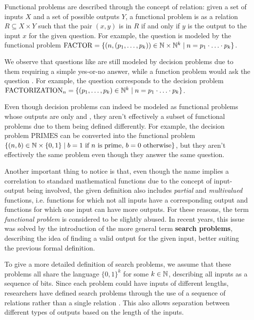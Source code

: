 \newpage

Functional problems are described through the concept of relation: given a set of inputs $X$ and a set of possible outputs $Y$, a functional problem is as a relation $R \subseteq X \times Y$ such that the pair $(x,y)$ is in $R$ if and only if $y$ is the output to the input $x$ for the given question. For example, the question  is modeled by the functional problem $\mathrm{FACTOR} = \{(n, (p_1, \ldots, p_k)) \in \mathbb{N} \times \mathbb{N}^k \mid n = p_1 \cdot \ldots \cdot p_k\}$.

We observe that questions like  are still modeled by decision problems due to them requiring a simple yes-or-no answer, while a function problem would ask the question . For example, the question  corresponds to the decision problem $\mathrm{FACTORIZATION}_n = \{(p_1, \ldots, p_k) \in \mathbb{N}^k \mid n = p_1 \cdot \ldots \cdot p_k\}$.

Even though decision problems can indeed be modeled as functional problems whose outputs are only  and , they aren't effectively a subset of functional problems due to them being defined differently. For example, the decision problem $\mathrm{PRIMES}$ can be converted into the functional problem $\{(n, b) \in \mathbb{N} \times \{0,1\} \mid b = 1 \text{ if } n \text{ is prime, } b = 0 \text{ otherwise}\}$, but they aren't effectively the same problem even though they answer the same question.

Another important thing to notice is that, even though the name implies a correlation to standard mathematical functions due to the concept of input-output being involved, the given definition also includes \textit{partial} and \textit{multivalued} functions, i.e. functions for which not all inputs have a corresponding output and functions for which one input can have more outputs. For these reasons, the term \textit{functional problem} is considered to be slightly abused. In recent years, this issue was solved by the introduction of the more general term \textbf{search problems}, describing the idea of finding a valid output for the given input, better suiting the previous formal definition.

To give a more detailed definition of search problems, we assume that these problems all share the language $\{0,1\}^k$ for some $k \in \mathbb{N}$, describing all inputs as a sequence of bits. Since each problem could have inputs of different lengths, researchers have defined search problems through the use of a sequence of relations rather than a single relation \cite{rel_comp_np_search, proofs_circuits_communication, tfnp_characterization}. This also allows separation between different types of outputs based on the length of the inputs.

